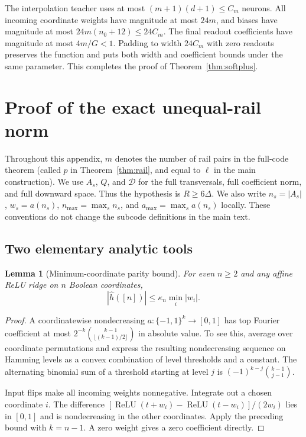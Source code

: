 \documentclass[11pt]{article}
\newtheorem{lemma}[theorem]{Lemma}
\theoremstyle{remark}\newtheorem{remark}[theorem]{Remark}
\newcommand{\relu}{\operatorname{ReLU}}\newcommand{\Var}{\operatorname{Var}}
\begin{document}
The interpolation teacher uses at most $(m+1)(d+1)\le C_m$ neurons. All incoming coordinate weights have
magnitude at most $24m$, and biases have magnitude at most
$24m(n_0+12)\le24C_m$.
The final readout coefficients have magnitude at most $4m/G<1$.
Padding to width $24C_m$ with zero readouts preserves the function and
puts both width and coefficient bounds under the same parameter. This
completes the proof of Theorem~\ref{thm:softplus}.

\appendix
\section{Proof of the exact unequal-rail norm}\label{app:rail}

Throughout this appendix, $m$ denotes the number of rail pairs in the
full-code theorem (called $p$ in Theorem~\ref{thm:rail}, and equal to
$\ell$ in the main construction). We use $A_s$,
$Q$, and $\mathcal D$ for the full transversals, full coefficient norm,
and full downward space. Thus the hypothesis is $R\ge6\Delta$.
We also write $n_s=|A_s|$, $w_s=a(n_s)$,
$n_{\max}=\max_s n_s$, and $a_{\max}=\max_s a(n_s)$ locally.
These conventions do not change the subcode definitions in the main text.

\subsection{Two elementary analytic tools}

\begin{lemma}[Minimum-coordinate parity bound]\label{lem:mincoord}
For even $n\ge2$ and any affine ReLU ridge on $n$ Boolean coordinates,
\[
 |\widehat h([n])|\le\kappa_n\min_i|w_i|.
\]
\end{lemma}
\begin{proof}
A coordinatewise nondecreasing $a:\{-1,1\}^k\to[0,1]$ has top Fourier
coefficient at most
$2^{-k}\binom{k-1}{\lfloor(k-1)/2\rfloor}$ in absolute value.
To see this, average over coordinate permutations and express the resulting
nondecreasing sequence on Hamming levels as a convex combination of level
thresholds and a constant. The alternating binomial sum of a threshold
starting at level $j$ is
$(-1)^{k-j}\binom{k-1}{j-1}$.

Input flips make all incoming weights nonnegative. Integrate out a chosen
coordinate $i$. The difference
$[\relu(t+w_i)-\relu(t-w_i)]/(2w_i)$ lies in $[0,1]$ and is nondecreasing
in the other coordinates. Apply the preceding bound with $k=n-1$.
A zero weight gives a zero coefficient directly.
\end{proof}
\end{document}
